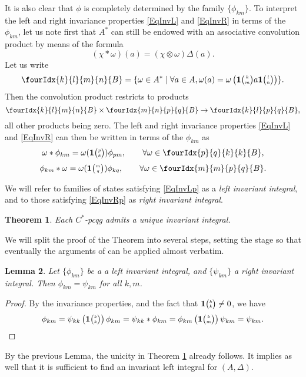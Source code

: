 \documentclass[11pt]{article}
\newcommand{\Grt}[3]{#1{\tiny {\begin{pmatrix} #2\\#3\end{pmatrix}}}}
\newcommand{\UnitC}[2]{\Grt{\mathbf{1}}{#1}{#2}}
\newcommand{\Gr}[5]{\fourIdx{#2}{#4}{#3}{#5}{#1}}%
\newtheorem{Theorem}{Theorem}[section]
\newtheorem{Lem}[Theorem]{Lemma}
\theoremstyle{definition}
\numberwithin{equation}{section}
\begin{document}
It is also clear that $\phi$ is completely determined by the family $\{\phi_{km}\}$. To interpret the left and right invariance properties \eqref{EqInvL} and \eqref{EqInvR} in terms of the $\phi_{km}$, let us note first that $A^*$ can still be endowed with an associative convolution product by means of the formula \[(\chi*\omega)(a) = (\chi\otimes \omega)\Delta(a).\] Let us write \[\Gr{B}{k}{m}{l}{n} = \{\omega \in A^* \mid \forall a\in A, \omega(a) = \omega\left(\UnitC{k}{m}a\UnitC{l}{n}\right)\}.\] Then the convolution product restricts to products \[\Gr{B}{k}{m}{l}{n}\times \Gr{B}{m}{p}{n}{q}\rightarrow \Gr{B}{k}{p}{l}{q},\] all other products being zero. The left and right invariance properties \eqref{EqInvL} and \eqref{EqInvR} can then be written in terms of the $\phi_{km}$ as \begin{equation}\label{EqInvLp}\omega*\phi_{km} = \omega(\UnitC{p}{k})\phi_{pm},\qquad \forall \omega \in \Gr{B}{p}{k}{q}{k},\end{equation}
\begin{equation}\label{EqInvRp}\phi_{km}*\omega = \omega(\UnitC{m}{q})\phi_{kq},\qquad \forall \omega \in \Gr{B}{m}{p}{m}{q}.\end{equation}

We will refer to families of states satisfying \eqref{EqInvLp} as a \emph{left invariant integral}, and to those satisfying \eqref{EqInvRp} as \emph{right invariant integral}.

\begin{Theorem}\label{TheoInvInt} Each $C^*$-pcqg admits a unique invariant integral.
\end{Theorem} 

We will split the proof of the Theorem into several steps, setting the stage so that eventually the arguments of \cite{MVD1} can be applied almost verbatim. 

\begin{Lem} Let $\{\phi_{km}\}$ be a a left invariant integral, and $\{\psi_{km}\}$ a right invariant integral. Then $\phi_{km}= \psi_{km}$ for all $k,m$. 
\end{Lem} 
\begin{proof} By the invariance properties, and the fact that $\UnitC{k}{k}\neq 0$, we have \[\phi_{km}  = \psi_{kk}\left(\UnitC{k}{k}\right)\phi_{km} = \psi_{kk}*\phi_{km}= \phi_{km}\left(\UnitC{k}{m}\right)\psi_{km} = \psi_{km}.\]

\end{proof} 

By the previous Lemma, the unicity in Theorem \ref{TheoInvInt} already follows. It implies as well that it is sufficient to find an invariant left integral for $(A,\Delta)$.
\end{document}
